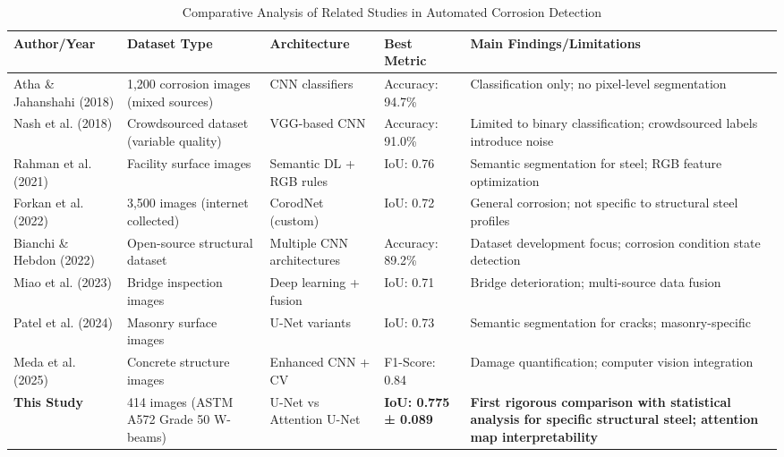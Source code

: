 \documentclass[Journal,letterpaper]{ascelike-new}
\begin{document}



\clearpage

\begin{table}[htbp]
\caption{Comparative Analysis of Related Studies in Automated Corrosion Detection}
\label{tab:related_works}
\centering
\small
\renewcommand{\arraystretch}{1.2}
\begin{tabular}{p{2.8cm} p{2.5cm} p{2.2cm} p{2.5cm} p{4.5cm}}
\hline\hline
\textbf{Author/Year} & \textbf{Dataset Type} & \textbf{Architecture} & \textbf{Best Metric} & \textbf{Main Findings/Limitations} \\
\hline
Atha \& Jahanshahi (2018) \cite{atha2018evaluation} & 1,200 corrosion images (mixed sources) & CNN classifiers & Accuracy: 94.7\% & Classification only; no pixel-level segmentation \\
\hline
Nash et al. (2018) \cite{nash2018automated} & Crowdsourced dataset (variable quality) & VGG-based CNN & Accuracy: 91.0\% & Limited to binary classification; crowdsourced labels introduce noise \\
\hline
Rahman et al. (2021) \cite{rahman2021semantic} & Facility surface images & Semantic DL + RGB rules & IoU: 0.76 & Semantic segmentation for steel; RGB feature optimization \\
\hline
Forkan et al. (2022) \cite{forkan2022corodnet} & 3,500 images (internet collected) & CorodNet (custom) & IoU: 0.72 & General corrosion; not specific to structural steel profiles \\
\hline
Bianchi \& Hebdon (2022) \cite{bianchi2022extendable} & Open-source structural dataset & Multiple CNN architectures & Accuracy: 89.2\% & Dataset development focus; corrosion condition state detection \\
\hline
Miao et al. (2023) \cite{miao2023deep} & Bridge inspection images & Deep learning + fusion & IoU: 0.71 & Bridge deterioration; multi-source data fusion \\
\hline
Patel et al. (2024) \cite{patel2024semantic} & Masonry surface images & U-Net variants & IoU: 0.73 & Semantic segmentation for cracks; masonry-specific \\
\hline
Meda et al. (2025) \cite{meda2025enhanced} & Concrete structure images & Enhanced CNN + CV & F1-Score: 0.84 & Damage quantification; computer vision integration \\
\hline
\textbf{This Study} & 414 images (ASTM A572 Grade 50 W-beams) & U-Net vs Attention U-Net & \textbf{IoU: 0.775 ± 0.089} & \textbf{First rigorous comparison with statistical analysis for specific structural steel; attention map interpretability} \\
\hline\hline
\end{tabular}
\normalsize
\end{table}
\end{document}
